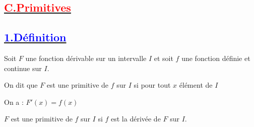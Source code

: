 \documentclass{article}
\newcounter{solution}
\begin{document}


\subsection*{\underline{\textbf{\textcolor{red}{C.Primitives}}}}
\subsection*{\underline{\textbf{\textcolor{blue}{1.Définition}}}}
Soit \( F \) une fonction dérivable sur un intervalle \( I \) et soit \( f \) une fonction définie et continue sur \( I \).
 
On dit que \( F \) est une primitive de \( f \) sur \( I \) si pour tout \( x \) élément de \( I \)

On a : \( F'(x)=f(x) \)

\( F \) est une primitive de \( f \) sur \( I \) si \( f \) est la dérivée de \( F \) sur \( I \).
\end{document}
